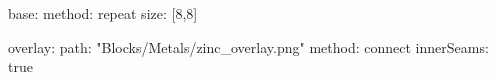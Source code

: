 base:
  method: repeat
  size: [8,8]
  
overlay:
  path: "Blocks/Metals/zinc_overlay.png"
  method: connect
  innerSeams: true